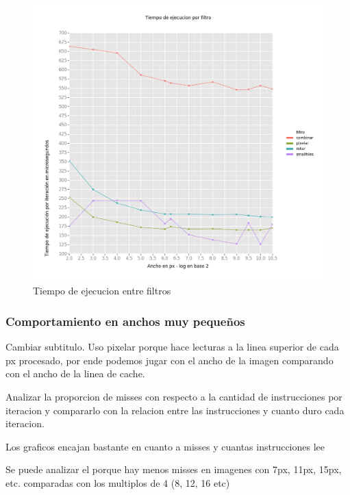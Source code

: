 \documentclass[a4paper]{article}
\begin{document}
\begin{figure}[!htb]
  \begin{center}
	\includegraphics[scale=0.6]{imagenes/diagramas/graficos/TiemposDeEjecucionEnFiltros.png}
	\caption{Tiempo de ejecucion entre filtros}
	\label{TiemposDeEjecucionEnFiltros}
  \end{center}
\end{figure}

\subsubsection*{Comportamiento en anchos muy pequeños}

Cambiar subtitulo. Uso pixelar porque hace lecturas a la linea superior de cada px procesado, por ende podemos jugar con el ancho de la imagen comparando con el ancho de la linea de cache.

Analizar la proporcion de misses con respecto a la cantidad de instrucciones por iteracion y compararlo con la relacion entre las instrucciones y cuanto duro cada iteracion.

Los graficos encajan bastante en cuanto a misses y cuantas instrucciones lee

Se puede analizar el porque hay menos misses en imagenes con 7px, 11px, 15px, etc. comparadas con los multiplos de 4 (8, 12, 16 etc)
\end{document}
